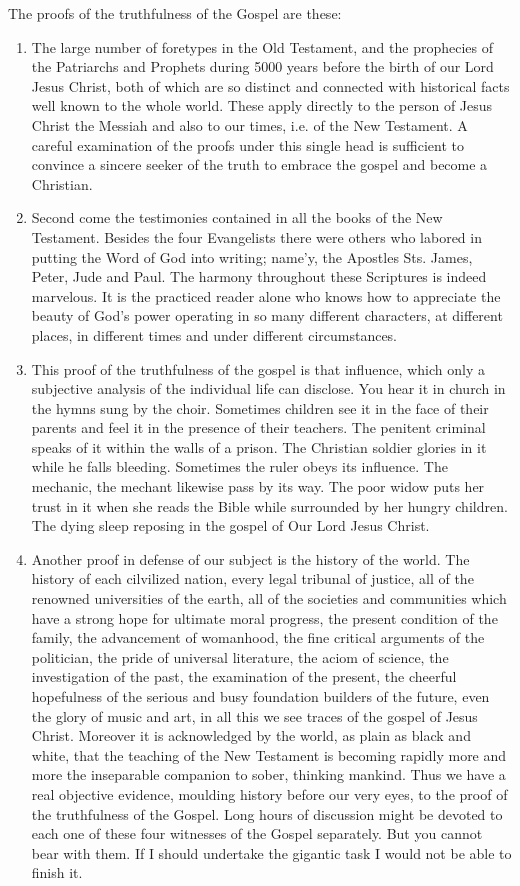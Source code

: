 The proofs of the truthfulness of the Gospel are these:
\begin{enumerate}
    \item The large number of foretypes in the Old Testament, and the prophecies of the Patriarchs and Prophets during 5000 years before the birth of our Lord Jesus Christ, both of which are so distinct and connected with historical facts well known to the whole world. These apply directly to the person of Jesus Christ the Messiah and also to our times, i.e. of the New Testament. A careful examination of the proofs under this single head is sufficient to convince a sincere seeker of the truth to embrace the gospel and become a Christian.
    \item Second come the testimonies contained in all the books of the New Testament. Besides the four Evangelists there were others who labored in putting the Word of God into writing; name'y, the Apostles Sts. James, Peter, Jude and Paul. The harmony throughout these Scriptures is indeed marvelous. It is the practiced reader alone who knows how to appreciate the beauty of God's power operating in so many different characters, at different places, in different times and under different circumstances.
    \item This proof of the truthfulness of the gospel is that influence, which only a subjective analysis of the individual life can disclose. You hear it in church in the hymns sung by the choir. Sometimes children see it in the face of their parents and feel it in the presence of their teachers. The penitent criminal speaks of it within the walls of a prison. The Christian soldier glories in it while he falls bleeding. Sometimes the ruler obeys its influence. The mechanic, the mechant likewise pass by its way. The poor widow puts her trust in it when she reads the Bible while surrounded by her hungry children. The dying sleep reposing in the gospel of Our Lord Jesus Christ.
    \item Another proof in defense of our subject is the history of the world. The history of each cilvilized nation, every legal tribunal of justice, all of the renowned universities of the earth, all of the societies and communities which have a strong hope for ultimate moral progress, the present condition of the family, the advancement of womanhood, the fine critical arguments of the politician, the pride of universal literature, the aciom of science, the investigation of the past, the examination of the present, the cheerful hopefulness of the serious and busy foundation builders of the future, even the glory of music and art, in all this we see traces of the gospel of Jesus Christ. Moreover it is acknowledged by the world, as plain as black and white, that the teaching of the New Testament is becoming rapidly more and more the inseparable companion to sober, thinking mankind. Thus we have a real objective evidence, moulding history before our very eyes, to the proof of the truthfulness of the Gospel. Long hours of discussion might be devoted to each one of these four witnesses of the Gospel separately. But you cannot bear with them. If I should undertake the gigantic task I would not be able to finish it.

\end{enumerate}
